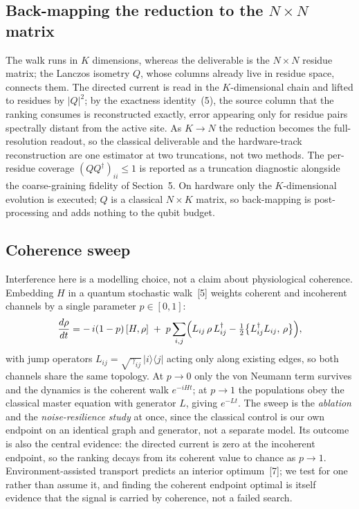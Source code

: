 \documentclass[10pt,a4paper]{article}
\begin{document}
\subsection{Back-mapping the reduction to the $N\times N$ matrix}

The walk runs in $K$ dimensions, whereas the deliverable is the $N\times N$ residue matrix; the
Lanczos isometry $Q$, whose columns already live in residue space, connects them. The directed
current is read in the $K$-dimensional chain and lifted to residues by $|Q|^{2}$; by the exactness
identity~(5), the source column that the ranking consumes is reconstructed exactly, error appearing
only for residue pairs spectrally distant from the active site. As $K \to N$ the reduction becomes the
full-resolution readout, so the classical deliverable and the hardware-track reconstruction are one
estimator at two truncations, not two methods. The per-residue coverage $(Q Q^{\dagger})_{ii}\le 1$
is reported as a truncation diagnostic alongside the coarse-graining fidelity of Section~5. On
hardware only the $K$-dimensional evolution is executed; $Q$ is a classical $N\times K$ matrix, so
back-mapping is post-processing and adds nothing to the qubit budget.

\subsection{Coherence sweep}

Interference here is a modelling choice, not a claim about physiological coherence. Embedding $H$ in
a quantum stochastic walk~[5] weights coherent and incoherent channels by a single
parameter $p \in [0,1]$:
\begin{equation}
\frac{d\rho}{dt}
 = -\,i(1-p)\,[H,\rho]
 \;+\; p\sum_{i,j}\Bigl(L_{ij}\,\rho\,L_{ij}^{\dagger}
        - \tfrac{1}{2}\bigl\{L_{ij}^{\dagger}L_{ij},\,\rho\bigr\}\Bigr),
\end{equation}
with jump operators $L_{ij} = \sqrt{\gamma_{ij}}\,|i\rangle\langle j|$ acting only along existing
edges, so both channels share the same topology. At $p \to 0$ only the von Neumann term survives and
the dynamics is the coherent walk $e^{-iHt}$; at $p \to 1$ the populations obey the classical master
equation with generator $L$, giving $e^{-Lt}$. The sweep is the \emph{ablation} and the
\emph{noise-resilience study} at once, since the classical control is our own endpoint on an
identical graph and generator, not a separate model. Its outcome is also the central evidence: the
directed current is zero at the incoherent endpoint, so the ranking decays from its coherent value to
chance as $p \to 1$. Environment-assisted transport predicts an interior optimum~[7];
we test for one rather than assume it, and finding the coherent endpoint optimal is itself evidence
that the signal is carried by coherence, not a failed search.
\end{document}
